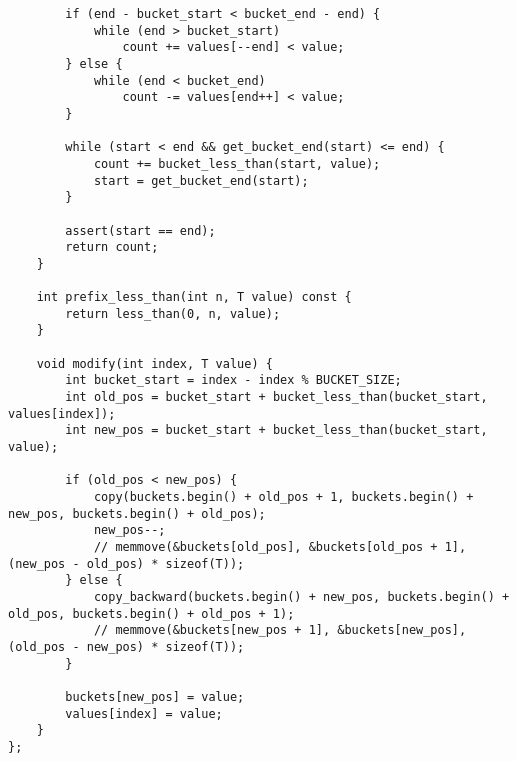 \documentclass{article}
\begin{document}
\begin{verbatim}
        if (end - bucket_start < bucket_end - end) {
            while (end > bucket_start)
                count += values[--end] < value;
        } else {
            while (end < bucket_end)
                count -= values[end++] < value;
        }

        while (start < end && get_bucket_end(start) <= end) {
            count += bucket_less_than(start, value);
            start = get_bucket_end(start);
        }

        assert(start == end);
        return count;
    }

    int prefix_less_than(int n, T value) const {
        return less_than(0, n, value);
    }

    void modify(int index, T value) {
        int bucket_start = index - index % BUCKET_SIZE;
        int old_pos = bucket_start + bucket_less_than(bucket_start, values[index]);
        int new_pos = bucket_start + bucket_less_than(bucket_start, value);

        if (old_pos < new_pos) {
            copy(buckets.begin() + old_pos + 1, buckets.begin() + new_pos, buckets.begin() + old_pos);
            new_pos--;
            // memmove(&buckets[old_pos], &buckets[old_pos + 1], (new_pos - old_pos) * sizeof(T));
        } else {
            copy_backward(buckets.begin() + new_pos, buckets.begin() + old_pos, buckets.begin() + old_pos + 1);
            // memmove(&buckets[new_pos + 1], &buckets[new_pos], (old_pos - new_pos) * sizeof(T));
        }

        buckets[new_pos] = value;
        values[index] = value;
    }
};\end{verbatim}
\end{document}

